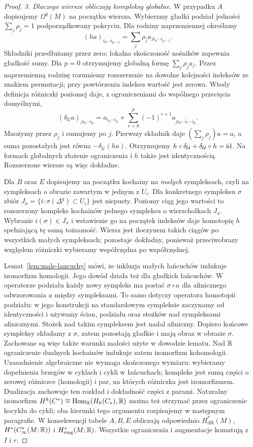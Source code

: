 \begin{proof}
\emph{3. Dlaczego wiersze obliczają kompleksy globalne.}
W przypadku $A$ dopisujemy $\Omega^q(M)$ na początku
wiersza. Wybierzmy gładki podział jedności
$\sum_j\rho_j=1$ podporządkowany pokryciu. Dla rodziny
naprzemiennej określamy
\[
 (ha)_{i_0\cdots i_{p-1}}
   =\sum_j\rho_j a_{j i_0\cdots i_{p-1}}.
\]
Składniki przedłużamy przez zero; lokalna skończoność
nośników zapewnia gładkość sumy. Dla $p=0$ otrzymujemy
globalną formę $\sum_j\rho_j a_j$.
Przez naprzemienną rodzinę rozumiemy rozszerzenie
na dowolne kolejności indeksów ze znakiem permutacji;
przy powtórzeniu indeksu wartość jest zerowa.
Wtedy definicja różniczki poziomej daje, z ograniczeniami
do wspólnego przecięcia domyślnymi,
\[
 (\delta_{\mathcal U}a)_{j i_0\cdots i_p}
 =a_{i_0\cdots i_p}
  +\sum_{r=0}^p(-1)^{r+1}a_{j i_0\cdots\widehat i_r\cdots i_p}.
\]
Mnożymy przez $\rho_j$ i sumujemy po $j$.
Pierwszy składnik daje $(\sum_j\rho_j)a=a$, a suma
pozostałych jest równa $-\delta_{\mathcal U}(ha)$.
Otrzymujemy $h\circ\delta_{\mathcal U}+\delta_{\mathcal U}\circ h=\mathrm{id}$.
Na formach globalnych złożenie
ograniczenia i $h$ także jest identycznością.
Rozszerzone wiersze są więc dokładne.

Dla $B$ oraz $E$ dopisujemy na początku kochainy
na \emph{małych} sympleksach, czyli na sympleksach
o obrazie zawartym w jednym z $U_i$. Dla konkretnego
sympleksu $\sigma$ zbiór
$J_\sigma=\{i:\sigma(\Delta^q)\subset U_i\}$ jest
niepusty. Poziomy ciąg jego wartości to rozszerzony
kompleks kochainów pełnego sympleksu o wierzchołkach
$J_\sigma$. Wybranie $i(\sigma)\in J_\sigma$ i wstawienie
go na początek indeksów daje homotopię $h$ spełniającą
tę samą tożsamość. Wiersz jest iloczynem takich ciągów
po wszystkich małych sympleksach; pozostaje dokładny,
ponieważ przeciwobrazy względem różniczki wybieramy
współrzędna po współrzędnej.

Lemat~\ref{lem:male-lancuchy} mówi, że inkluzja małych
łańcuchów indukuje izomorfizm homologii. Jego dowód
działa też dla gładkich łańcuchów. W operatorze podziału
każdy nowy sympleks ma postać $\sigma\circ a$ dla
afinicznego odwzorowania $a$ między sympleksami.
To samo dotyczy operatora homotopii podziału: w jego
konstrukcji na standardowym sympleksie zaczynamy od
identyczności i używamy ścian, podziału oraz stożków
nad sympleksami afinicznymi. Stożek nad takim sympleksem
jest nadal afiniczny. Dopiero końcowe sympleksy składamy
z $\sigma$, zatem pozostają gładkie i mają obraz
w obrazie $\sigma$. Zachowane są więc także warunki
małości użyte w dowodzie lematu.
Nad $\mathbb{R}$ ograniczenie dualnych kochainów indukuje
zatem izomorfizm kohomologii. Uzasadnienie algebraiczne
nie wymaga skończonego wymiaru: wybieramy dopełnienia
brzegów w cyklach i cykli w łańcuchach; kompleks jest
sumą części o zerowej różniczce (homologii) i par,
na których różniczka jest izomorfizmem. Dualizacja
zachowuje ten rozkład i dokładność części z parami.
Naturalny izomorfizm
$H^k(C^*)\cong\operatorname{Hom}_{\mathbb{R}}(H_k(C_*),\mathbb{R})$
można też otrzymać przez ograniczenie kocyklu do cykli;
oba kierunki tego argumentu rozpisujemy w następnym paragrafie.
W konsekwencji tabele $A,B,E$ obliczają odpowiednio
$H^*_{\mathrm{dR}}(M)$, $H^*(C_\infty^*(M;\mathbb{R}))$
i $H^*_{\mathrm{sing}}(M;\mathbb{R})$.
Wszystkie ograniczenia i augmentacje komutują z $I$ i $r$.


\end{proof}
